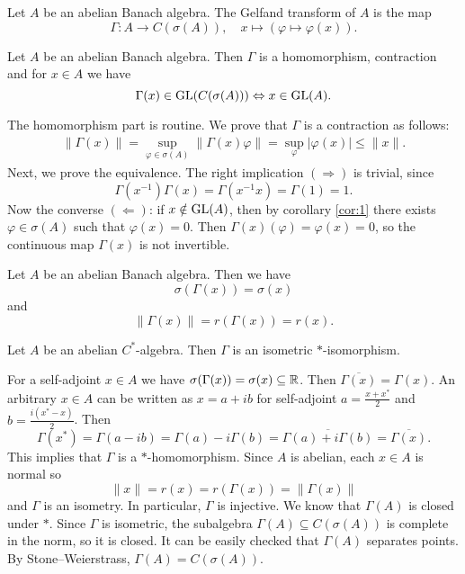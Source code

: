 \begin{definition}
  Let $A$ be an abelian Banach algebra. The Gelfand transform of $A$ is the map 
  $$\Gamma: A \to C(\sigma(A)),\quad x \mapsto (\varphi \mapsto \varphi(x)).$$
\end{definition}

\begin{theorem}
  Let $A$ be an abelian Banach algebra. Then $\Gamma$ is a homomorphism, contraction and for 
  $x \in A$ we have $$\Gamma(x) \in \operatorname{GL}(C(\sigma (A))) \Leftrightarrow x \in \operatorname{GL}(A).$$
\end{theorem}

\begin{myproof}
  The homomorphism part is routine. We prove that $\Gamma$ is a contraction as follows:
  \begin{align*}
    \| \Gamma(x)\| = \sup_{\varphi \in \sigma (A)} \| \Gamma(x) \varphi\| = \sup_{\varphi} |\varphi(x)| \leq \|x\|.
  \end{align*}
  Next, we prove the equivalence. The right implication $(\Rightarrow)$ is trivial, since 
  $$\Gamma(x^{-1}) \Gamma(x) = \Gamma(x^{-1} x) = \Gamma(1) = 1.$$
  Now the converse $(\Leftarrow)$: if $x \notin \operatorname{GL}(A)$,
  then by corollary \ref{cor:1} there exists $\varphi \in \sigma(A)$ such that $\varphi(x) = 0$.
  Then $\Gamma(x) (\varphi) = \varphi(x) = 0$, so the continuous map $\Gamma(x)$ is not invertible.
\end{myproof}

\begin{corollary}
  Let $A$ be an abelian Banach algebra. Then 
  we have $$\sigma (\Gamma(x)) = \sigma (x)$$
  and $$\| \Gamma(x)\| = r (\Gamma(x)) = r(x).$$
\end{corollary}

\begin{theorem}[Gelfand]
  Let $A$ be an abelian $C^*$-algebra. Then $\Gamma$ is an isometric $*$-isomorphism.
\end{theorem}

\begin{myproof}
  For a self-adjoint $x \in A$ we have $\sigma (\Gamma(x)) = \sigma(x) \subseteq \mathbb {R}$.
  Then $\overline{\Gamma(x)} = \Gamma(x)$. An arbitrary $x \in A$ can be written as $x = a + ib$
  for self-adjoint $a= \frac{x + x^*}{2}$ and $b = \frac{i(x^* - x)}{2}$.
  Then $$\Gamma(x^*) = \Gamma(a - ib) = \Gamma(a) - i \Gamma(b) = \overline{\Gamma(a) + i \Gamma(b)} = \overline{\Gamma(x)}.$$
  This implies that $\Gamma$ is a $*$-homomorphism.
  Since $A$ is abelian, each $x \in A$ is normal so 
  $$\| x\| = r(x) = r(\Gamma(x)) = \|\Gamma(x)\|$$
  and $\Gamma$ is an isometry.
  In particular, $\Gamma$ is injective. We know that $\Gamma(A)$ is closed under $*$. Since $\Gamma$
  is isometric, the subalgebra $\Gamma(A) \subseteq C(\sigma(A))$ is complete in the norm, so it is closed. It can be easily checked that $\Gamma (A)$ separates points.
  By Stone--Weierstrass, $\Gamma(A) = C(\sigma(A))$.
\end{myproof}

